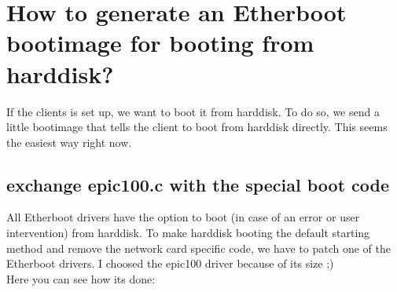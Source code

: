 \section{How to generate an Etherboot bootimage for booting from harddisk?}
If the clients is set up, we want to boot it from harddisk. To do so, we send a little bootimage that tells the client to boot from harddisk directly. This seems the easiest way right now.
\subsection{exchange epic100.c with the special boot code}
All Etherboot drivers have the option to boot (in case of an error or user intervention) from harddisk. To make harddisk booting the default starting method and remove the network card specific code, we have to patch one of the Etherboot drivers. I choosed the epic100 driver because of its size ;)\\

Here you can see how its done:

